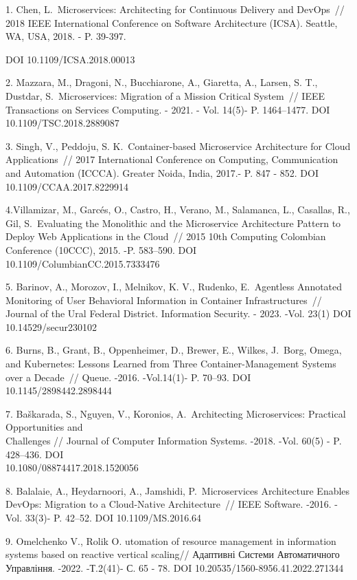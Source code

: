 \begin{references}
1. Chen, L.~Microservices: Architecting for Continuous Delivery and
DevOps~// 2018 IEEE International Conference on Software Architecture
(ICSA). Seattle, WA, USA, 2018. - P. 39-397.

DOI 10.1109/ICSA.2018.00013

2. Mazzara, M., Dragoni, N., Bucchiarone, A., Giaretta, A., Larsen, S.
T., Dustdar, S.~Microservices: Migration of a Mission Critical System~//
IEEE Transactions on Services Computing. - 2021. - Vol. 14(5)- P.
1464--1477. DOI 10.1109/TSC.2018.2889087

3. Singh, V., Peddoju, S. K.~Container-based Microservice Architecture
for Cloud Applications~// 2017 International Conference on Computing,
Communication and Automation (ICCCA). Greater Noida, India, 2017.- P.
847 - 852. DOI 10.1109/CCAA.2017.8229914

4.Villamizar, M., Garcés, O., Castro, H., Verano, M., Salamanca, L.,
Casallas, R., Gil, S.~Evaluating the Monolithic and the Microservice
Architecture Pattern to Deploy Web Applications in the Cloud~// 2015
10th Computing Colombian Conference (10CCC), 2015. -P. 583--590. DOI
\\10.1109/ColumbianCC.2015.7333476

5. Barinov, A., Morozov, I., Melnikov, K. V., Rudenko, E.~Agentless
Annotated Monitoring of User Behavioral Information in Container
Infrastructures~// Journal of the Ural Federal District. Information
Security. - 2023. -Vol. 23(1) DOI 10.14529/secur230102

6. Burns, B., Grant, B., Oppenheimer, D., Brewer, E., Wilkes, J.~Borg,
Omega, and Kubernetes: Lessons Learned from Three Container-Management
Systems over a Decade~// Queue. -2016. -Vol.14(1)- P. 70--93. DOI
10.1145/2898442.2898444

7. Baškarada, S., Nguyen, V., Koronios, A.~Architecting Microservices:
Practical Opportunities and \\Challenges // Journal of Computer
Information Systems. -2018. -Vol. 60(5) - P. 428--436. DOI \\
10.1080/08874417.2018.1520056

8. Balalaie, A., Heydarnoori, A., Jamshidi, P.~Microservices Architecture
Enables DevOps: Migration to a Cloud-Native Architecture~// IEEE
Software. -2016. -Vol. 33(3)- P. 42--52. DOI 10.1109/MS.2016.64

9. Omelchenko V., Rolik O. utomation of resource management in
information systems based on reactive vertical scaling// Адаптивні
Системи Автоматичного Управління. -2022. -Т.2(41)- С. 65 - 78. DOI
10.20535/1560-8956.41.2022.271344


\end{references}
